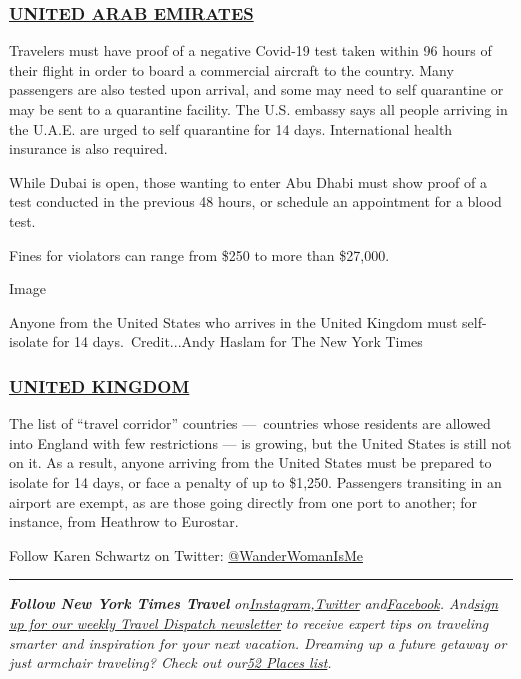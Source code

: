 \hypertarget{united-arab-emirates}{%
\subsubsection{\texorpdfstring{\href{https://ae.usembassy.gov/u-s-citizen-services/covid-19-information/}{UNITED
ARAB EMIRATES}}{UNITED ARAB EMIRATES}}\label{united-arab-emirates}}

Travelers must have proof of a negative Covid-19 test taken within 96
hours of their flight in order to board a commercial aircraft to the
country. Many passengers are also tested upon arrival, and some may need
to self quarantine or may be sent to a quarantine facility. The U.S.
embassy says all people arriving in the U.A.E. are urged to self
quarantine for 14 days. International health insurance is also required.

While Dubai is open, those wanting to enter Abu Dhabi must show proof of
a test conducted in the previous 48 hours, or schedule an appointment
for a blood test.

Fines for violators can range from \$250 to more than \$27,000.

Image

Anyone from the United States who arrives in the United Kingdom must
self-isolate for 14 days.~Credit...Andy Haslam for The New York Times

\hypertarget{united-kingdom}{%
\subsubsection{\texorpdfstring{\href{https://www.gov.uk/uk-border-control}{UNITED
KINGDOM}}{UNITED KINGDOM}}\label{united-kingdom}}

The list of ``travel corridor'' countries ---~countries whose residents
are allowed into England with few restrictions --- is growing, but the
United States is still not on it. As a result, anyone arriving from the
United States must be prepared to isolate for 14 days, or face a penalty
of up to \$1,250. Passengers transiting in an airport are exempt, as are
those going directly from one port to another; for instance, from
Heathrow to Eurostar.

Follow Karen Schwartz on Twitter:
\href{https://twitter.com/wanderwomanisme?lang=en}{@WanderWomanIsMe}

\begin{center}\rule{0.5\linewidth}{\linethickness}\end{center}

\emph{\textbf{Follow New York Times Travel}}
\emph{on}\href{https://www.instagram.com/nytimestravel/}{\emph{Instagram}}\emph{,}\href{https://twitter.com/nytimestravel}{\emph{Twitter}}
\emph{and}\href{https://www.facebookcorewwwi.onion/nytimestravel/}{\emph{Facebook}}\emph{.
And}\href{https://www.nytimes3xbfgragh.onion/newsletters/traveldispatch}{\emph{sign
up for our weekly Travel Dispatch newsletter}} \emph{to receive expert
tips on traveling smarter and inspiration for your next vacation.
Dreaming up a future getaway or just armchair traveling? Check out
our}\href{https://www.nytimes3xbfgragh.onion/interactive/2020/travel/places-to-visit.html}{\emph{52
Places list}}\emph{.}

